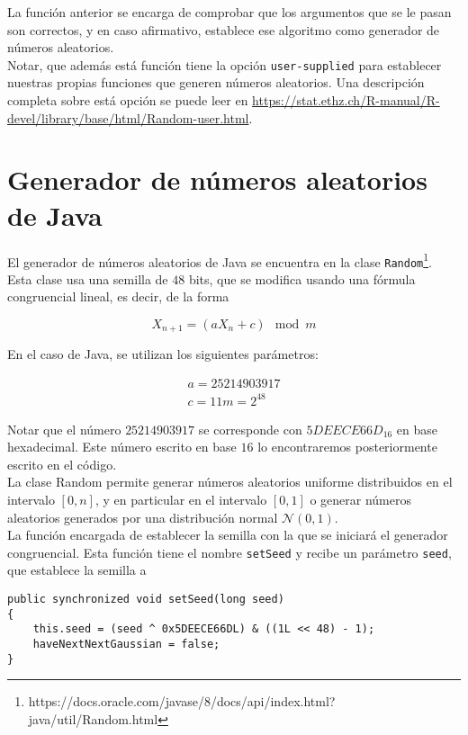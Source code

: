 \documentclass[12pt,a4paper,twoside,openright,titlepage,final]{article}
\begin{document}
La función anterior se encarga de comprobar que los argumentos que se le pasan son correctos, y en caso afirmativo, establece ese algoritmo como generador de números aleatorios.\\

Notar, que además está función tiene la opción \texttt{user-supplied} para establecer nuestras propias funciones que generen números aleatorios. Una descripción completa sobre está opción se puede leer en \url{https://stat.ethz.ch/R-manual/R-devel/library/base/html/Random-user.html}.\\


\section{Generador de números aleatorios de Java}

El generador de números aleatorios de Java se encuentra en la clase \texttt{Random}\footnote{https://docs.oracle.com/javase/8/docs/api/index.html?java/util/Random.html}. Esta clase usa una semilla de $48$ bits, que se modifica usando una fórmula congruencial lineal, es decir, de la forma

\[ X_{n+1} = (a X_n + c) \mod m \]

En el caso de Java, se utilizan los siguientes parámetros:

\[\begin{array}{c}
a = 25214903917\\
c = 11
m = 2^{48}
\end{array}\]

Notar que el número $25214903917$ se corresponde con $5DEECE66D_{16}$ en base hexadecimal. Este número escrito en base $16$ lo encontraremos posteriormente escrito en el código.\\

La clase Random permite generar números aleatorios uniforme distribuidos en el intervalo $[0,n]$, y en particular en el intervalo $[0,1]$ o generar números aleatorios generados por una distribución normal $\mathcal{N}(0,1)$.\\

La función encargada de establecer la semilla con la que se iniciará el generador congruencial. Esta función tiene el nombre \texttt{setSeed} y recibe un parámetro \texttt{seed}, que establece la semilla a

\begin{verbatim}
public synchronized void setSeed(long seed)
{
	this.seed = (seed ^ 0x5DEECE66DL) & ((1L << 48) - 1);
	haveNextNextGaussian = false;
}
\end{verbatim}
\end{document}
